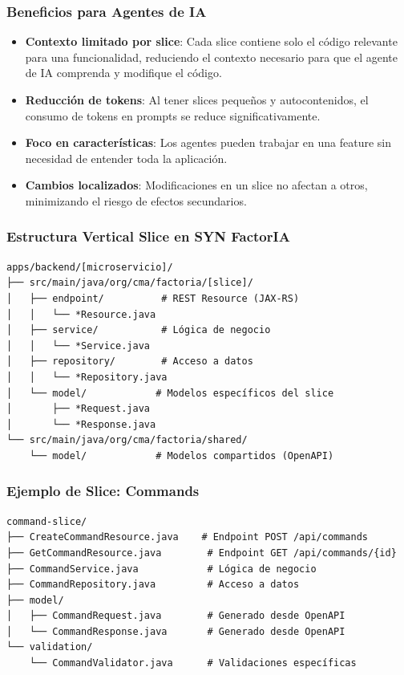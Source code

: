 \documentclass[12pt,a4paper,spanish]{article}
\begin{document}
\subsubsection{Beneficios para Agentes de IA}

\begin{itemize}
    \item \textbf{Contexto limitado por slice}: Cada slice contiene solo el código relevante para una funcionalidad, reduciendo el contexto necesario para que el agente de IA comprenda y modifique el código.
    \item \textbf{Reducción de tokens}: Al tener slices pequeños y autocontenidos, el consumo de tokens en prompts se reduce significativamente.
    \item \textbf{Foco en características}: Los agentes pueden trabajar en una feature sin necesidad de entender toda la aplicación.
    \item \textbf{Cambios localizados}: Modificaciones en un slice no afectan a otros, minimizando el riesgo de efectos secundarios.
\end{itemize}

\subsubsection{Estructura Vertical Slice en SYN FactorIA}

\begin{verbatim}
apps/backend/[microservicio]/
├── src/main/java/org/cma/factoria/[slice]/
│   ├── endpoint/          # REST Resource (JAX-RS)
│   │   └── *Resource.java
│   ├── service/           # Lógica de negocio
│   │   └── *Service.java
│   ├── repository/        # Acceso a datos
│   │   └── *Repository.java
│   └── model/            # Modelos específicos del slice
│       ├── *Request.java
│       └── *Response.java
└── src/main/java/org/cma/factoria/shared/
    └── model/            # Modelos compartidos (OpenAPI)
\end{verbatim}

\subsubsection{Ejemplo de Slice: Commands}

\begin{verbatim}
command-slice/
├── CreateCommandResource.java    # Endpoint POST /api/commands
├── GetCommandResource.java        # Endpoint GET /api/commands/{id}
├── CommandService.java            # Lógica de negocio
├── CommandRepository.java         # Acceso a datos
├── model/
│   ├── CommandRequest.java        # Generado desde OpenAPI
│   └── CommandResponse.java       # Generado desde OpenAPI
└── validation/
    └── CommandValidator.java      # Validaciones específicas
\end{verbatim}
\end{document}
